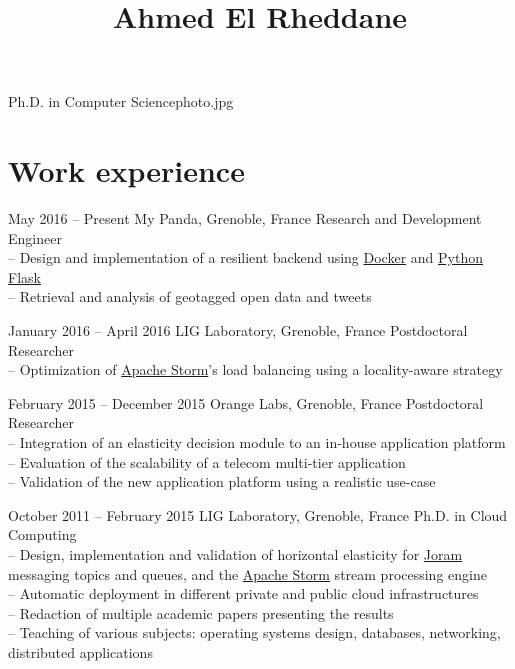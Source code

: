 \documentclass{mytccv}
\begin{document}
\title{Ahmed El Rheddane}{Ph.D. in Computer Science}{photo.jpg}

\section{Work experience}
\begin{eventlist}
\item{May 2016 -- Present}
     {My Panda, Grenoble, France}
     {Research and Development Engineer}\\
-- Design and implementation of a resilient backend using \href{https://www.docker.com/}{Docker} and \href{http://flask.pocoo.org/}{Python Flask}\medskip\\
-- Retrieval and analysis of geotagged open data and tweets

\vspace{\fill}

\item{January 2016 -- April 2016}
     {LIG Laboratory, Grenoble, France}
     {Postdoctoral Researcher}\\
-- Optimization of \href{https://storm.apache.org/}{Apache Storm}'s load balancing using a locality-aware strategy

\vspace{\fill}

\item{February 2015 -- December 2015}
     {Orange Labs, Grenoble, France}
     {Postdoctoral Researcher}\\
-- Integration of an elasticity decision module to an in-house application platform\medskip\\
-- Evaluation of the scalability of a telecom multi-tier application\medskip\\
-- Validation of the new application platform using a realistic use-case

\vspace{\fill}

\item{October 2011 -- February 2015}
     {LIG Laboratory, Grenoble, France}
     {Ph.D. in Cloud Computing}\\
-- Design, implementation and validation of horizontal elasticity for \href{http://joram.ow2.org/}{Joram} messaging topics and queues, and the \href{https://storm.apache.org/}{Apache Storm} stream processing engine\medskip\\
-- Automatic deployment in different private and public cloud infrastructures\medskip\\
-- Redaction of multiple academic papers presenting the results\medskip\\
-- Teaching of various subjects: operating systems design, databases, networking, distributed applications


\end{eventlist}
\end{document}
